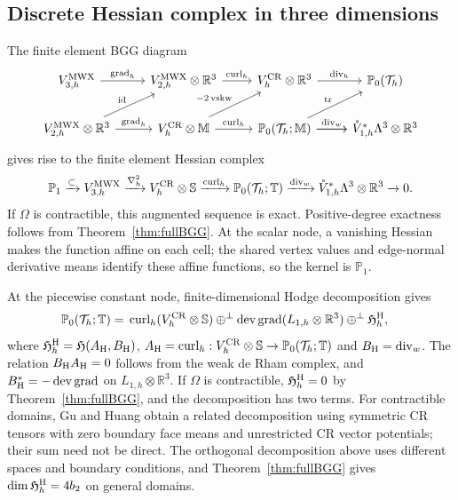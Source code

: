 \documentclass[10pt]{amsart}
\numberwithin{equation}{section}
\newcommand{\curl}{\operatorname{curl}}
\renewcommand{\div}{\operatorname{div}}
\newcommand{\grad}{\operatorname{grad}}
\newcommand{\tr}{\operatorname{tr}}
\newcommand{\dev}{\operatorname{dev}}
\newcommand{\vskw}{\operatorname{vskw}}
\begin{document}
\subsection{Discrete Hessian complex in three dimensions}
The finite element BGG diagram
\begin{equation*}
\begin{tikzcd}
V_{3,h}^{\rm MWX}
\arrow{r}{\grad_h}
&
V_{2,h}^{\rm MWX}\otimes\mathbb R^3
 \arrow{r}{\curl_h}
 &
V_{h}^{\rm CR}\otimes\mathbb R^3
 \arrow{r}{\div_h}
 & \mathbb P_0(\mathcal T_h)
 \\
V_{2,h}^{\rm MWX}\otimes\mathbb R^3
 \arrow[ur,swap,"{\rm id}"'] 
 \arrow{r}{\grad_h}
 & 
V_{h}^{\rm CR}\otimes\mathbb M
 \arrow[ur,"- 2\vskw"] \arrow{r}{\curl_h}
 & 
\mathbb P_0(\mathcal T_h; \mathbb M) 
 \arrow[ur,"\tr"] \arrow{r}{\div_w} \arrow[r] 
 &\mathring{V}_{1,h}^{*}\Lambda^3\otimes\mathbb R^3
\end{tikzcd}
\end{equation*}
gives rise to the finite element Hessian complex
\begin{equation}\label{eq:hesscomplex3dfem}
\mathbb P_1\xrightarrow{\subset} V_{3,h}^{\rm MWX}\xrightarrow{\nabla_h^2}V_{h}^{\rm CR}\otimes\mathbb S\xrightarrow{\curl_h}\mathbb P_0(\mathcal T_h;\mathbb T)\xrightarrow{\div_w} \mathring{V}_{1,h}^{*}\Lambda^3\otimes\mathbb R^3\xrightarrow{}0.
\end{equation}
If $\Omega$ is contractible, this augmented sequence is exact.
Positive-degree exactness follows from Theorem~\ref{thm:fullBGG}.
At the scalar node, a vanishing Hessian makes the function affine on each
cell; the shared vertex values and edge-normal derivative means identify
these affine functions, so the kernel is $\mathbb P_1$.

At the piecewise constant node, finite-dimensional Hodge decomposition gives
\begin{align*}
\mathbb P_0(\mathcal T_h;\mathbb T)
={}&\curl_h(V_{h}^{\rm CR}\otimes\mathbb S)
\oplus^\perp\dev\grad(L_{1,h}\otimes\mathbb R^3)
\oplus^\perp\mathfrak H_h^{\rm H},
\end{align*}
where $\mathfrak H_h^{\rm H}=\mathfrak H(A_{\rm H},B_{\rm H})$,
$A_{\rm H}=\curl_h:V_h^{\rm CR}\otimes\mathbb S\to
\mathbb P_0(\mathcal T_h;\mathbb T)$ and $B_{\rm H}=\div_w$.
The relation $B_{\rm H}A_{\rm H}=0$ follows from the weak de Rham complex,
and $B_{\rm H}^*=-\dev\grad$ on $L_{1,h}\otimes\mathbb R^3$.
If $\Omega$ is contractible, $\mathfrak H_h^{\rm H}=0$ by
Theorem~\ref{thm:fullBGG}, and the decomposition has two terms.
For contractible domains, Gu and Huang \cite{GuHuang2026} obtain a related
decomposition using symmetric CR tensors with zero boundary face means
and unrestricted CR vector potentials; their sum need not be direct.
The orthogonal decomposition above uses different spaces and boundary
conditions, and Theorem~\ref{thm:fullBGG} gives
$\dim\mathfrak H_h^{\rm H}=4b_2$ on general domains.
\end{document}

